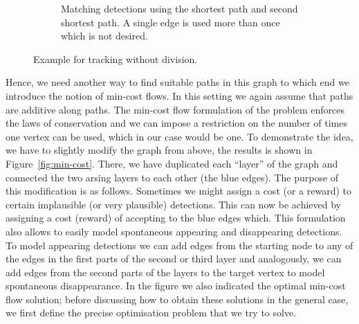 \begin{figure}[htpb]
\begin{subfigure}{\textwidth}
    \caption{Matching detections using the shortest path and second shortest
      path. A single edge is used more than once which is not desired.}
  \end{subfigure}
  \caption{Example for tracking without division.}%
  \label{fig:tracking}
\end{figure}

Hence, we need another way to find suitable paths in this graph to which end we
introduce the notion of min-cost flows. In this setting we again assume that
paths are additive along paths. The min-cost flow formulation of the problem
enforces the laws of conservation and we can impose a restriction on the number
of times one vertex can be used, which in our case would be one. To demonstrate
the idea, we have to slightly modify the graph from above, the results is shown
in Figure~\ref{fig:min-cost}. There, we have duplicated each ``layer'' of the
graph and connected the two arsing layers to each other (the blue edges). The
purpose of this modification is as follows. Sometimes we might assign a cost (or
a reward) to certain implausible (or very plausible) detections. This can now be
achieved by assigning a cost (reward) of accepting to the blue edges which. This
formulation also allows to easily model spontaneous appearing and disappearing
detections. To model appearing detections we can add edges from the starting
node to any of the edges in the first parts of the second or third layer and
analogously, we can add edges from the second parts of the layers to the target
vertex to model spontaneous disappearance. In the figure we also indicated the
optimal min-cost flow solution; before discussing how to obtain these solutions
in the general case, we first define the precise optimisation problem that we
try to solve.

